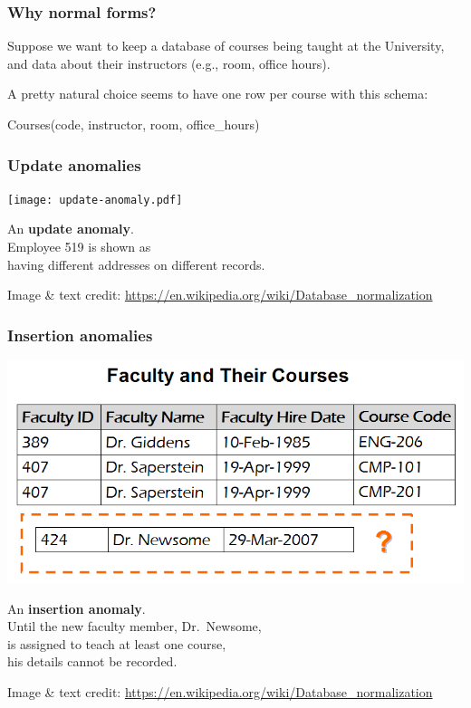 \documentclass[english,serif,mathserif]{beamer}
\begin{document}
\begin{frame}[fragile]
  \frametitle{Why normal forms?}
  Suppose we want to keep a database of courses being taught at the University,
  and data about their instructors (e.g., room, office hours).

  \+
  A pretty natural choice seems to have one row per course with this schema:
\begin{semiverbatim}
Courses(code, instructor, room, office_hours)
\end{semiverbatim}

  \+

  \+

  \+
\end{frame}


\begin{frame}
  \frametitle{Update anomalies}
  \begin{center}
    \texttt{[image: update-anomaly.pdf]}

    \+
    An \textbf{update anomaly}. \\
    Employee 519 is shown as \\ having different addresses on different records.

    \+
    {\tiny
      Image \& text credit: \url{https://en.wikipedia.org/wiki/Database_normalization}}
  \end{center}
\end{frame}


\begin{frame}
  \frametitle{Insertion anomalies}
  \begin{center}
    \includegraphics[width=0.8\linewidth]{insertion-anomaly.png}

    \+ An \textbf{insertion anomaly}. \\ Until the new faculty member, Dr.~Newsome, \\
    is assigned to teach at least one course, \\ his details cannot be recorded.

    \+
    {\tiny
      Image \& text credit: \url{https://en.wikipedia.org/wiki/Database_normalization}}
  \end{center}
\end{frame}
\end{document}
